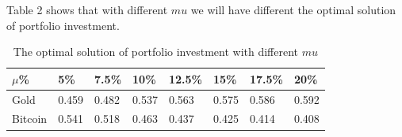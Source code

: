 \documentclass[12pt]{article}
\begin{document}
Table 2 shows that with different $mu$ we will have different the optimal solution of portfolio investment.
\begin{table}
    \caption{The optimal solution of portfolio investment with different $mu$}
    \begin{center}
    \begin{tabular}{p{40pt}p{40pt}p{40pt}p{40pt}p{40pt}p{40pt}p{40pt}p{40pt}}
    \toprule
    $\mu$\%       & 5\%&7.5\%&10\%&12.5\%&15\%&17.5\%&20\% \\
    \midrule
    Gold       & 0.459    &0.482&0.537&0.563&0.575&0.586&0.592 \\
    Bitcoin       & 0.541&0.518&0.463&0.437&0.425&0.414&0.408 \\
    \bottomrule 
    \end{tabular}
    \end{center}
    \end{table}
\end{document}
